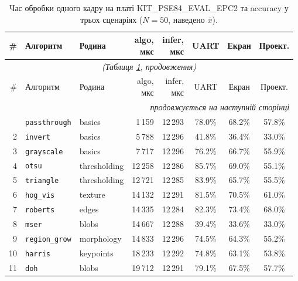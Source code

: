 \documentclass[a4paper,12pt]{article}
\begin{document}
\begingroup
\scriptsize
\setlength{\tabcolsep}{2pt}
\renewcommand{\arraystretch}{1.05}
\begin{longtable}{@{}r l l r r c c c@{}}
	\caption{Час обробки одного кадру на платі KIT\_PSE84\_EVAL\_EPC2 та accuracy у трьох сценаріях ($N=50$, наведено $\bar{x}$).}
	\label{tab:device}\\
	\toprule
	\# & Алгоритм & Родина & \shortstack{algo,\\мкс} & \shortstack{infer,\\мкс} & UART & Екран & Проект. \\
	\midrule
	\endfirsthead
	\multicolumn{8}{c}{\textit{(Таблиця \ref{tab:device}, продовження)}}\\
	\toprule
	\# & Алгоритм & Родина & \shortstack{algo,\\мкс} & \shortstack{infer,\\мкс} & UART & Екран & Проект. \\
	\midrule
	\endhead
	\midrule
	\multicolumn{8}{r}{\textit{продовжується на наступній сторінці}}\\
	\endfoot
	\bottomrule
	\endlastfoot
	1  & \texttt{passthrough}        & basics      & 1\,159   & 12\,293 & 78.0\% & 68.2\% & 57.8\% \\
	2  & \texttt{invert}             & basics      & 5\,788   & 12\,296 & 41.8\% & 36.4\% & 33.0\% \\
	3  & \texttt{grayscale}          & basics      & 7\,717   & 12\,296 & 76.2\% & 66.7\% & 55.9\% \\
	4  & \texttt{otsu}               & thresholding& 12\,258  & 12\,286 & 85.7\% & 69.0\% & 55.1\% \\
	5  & \texttt{triangle}           & thresholding& 12\,721  & 12\,285 & 83.9\% & 65.7\% & 55.5\% \\
	6  & \texttt{hog\_vis}           & texture     & 14\,132  & 12\,291 & 81.5\% & 70.5\% & 61.0\% \\
	7  & \texttt{roberts}            & edges       & 14\,335  & 12\,284 & 82.3\% & 73.4\% & 68.0\% \\
	8  & \texttt{mser}               & blobs       & 14\,667  & 12\,288 & 39.4\% & 33.6\% & 33.0\% \\
	9  & \texttt{region\_grow}       & morphology  & 14\,833  & 12\,296 & 74.5\% & 64.3\% & 55.2\% \\
	10 & \texttt{harris}             & keypoints   & 18\,233  & 12\,292 & 74.8\% & 63.1\% & 53.8\% \\
	11 & \texttt{doh}                & blobs       & 19\,712  & 12\,291 & 79.1\% & 67.5\% & 57.7\% \\

\end{longtable}
\end{document}
